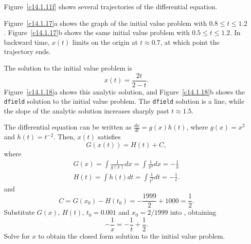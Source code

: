 \documentclass{ximera}
\begin{document}
\newpage
{} Figure~\ref{c14.1.11f} shows several trajectories of the
differential equation.

\begin{figure}[htb]
                       \centerline{%
                       }
\end{figure}

 Figure~\ref{c14.1.17}a shows the graph of the initial
value problem with $0.8 \leq t \leq 1.2$.  Figure~\ref{c14.1.17}b shows
the same initial value problem with $0.5 \leq t \leq 1.2$.  In
backward time, $x(t)$ limits on the origin at $t \approx 0.7$, at
which point the trajectory ends.

\begin{figure}[htb]
                       \centerline{%
                       }
\end{figure}

 \ans The solution to the initial value problem is
\[
x(t) = \frac{2t}{2 - t}.
\]
Figure~\ref{c14.1.18}a shows this analytic solution, and
Figure~\ref{c14.1.18}b shows the {\tt dfield} solution to the initial
value problem.  The {\tt dfield} solution is a line, while the slope
of the analytic solution increases sharply past $t \approx 1.5$.

\soln The differential equation can be written as $\frac{dx}{dt} = g(x)h(t)$,
where $g(x) = x^2$ and $h(t) = t^{-2}$.  Then, $x(t)$ satisfies
\begin{equation} \label{eq:14.1.18}
G(x(t)) = H(t) + C,
\end{equation}
where
\[
\begin{array}{l}
G(x) = \int\frac{1}{g(x)}dx = \int\frac{1}{x^2}dx = -\frac{1}{x} \\
H(t) = \int h(t)dt = \int\frac{1}{t^2}dt = -\frac{1}{t}.
\end{array}
\]
and
\[
C = G(x_0) - H(t_0) = -\frac{1999}{2} + 1000  = \frac{1}{2}.
\]
Substitute $G(x)$, $H(t)$, $t_0 = 0.001$ and $x_0 = 2/1999$ into
, obtaining
\[
-\frac{1}{x} = -\frac{1}{t} + \frac{1}{2}.
\]
Solve for $x$ to obtain the closed form solution to the initial value problem.

\begin{figure}[htb]
                       \centerline{%
                       }
\end{figure}
\end{document}
